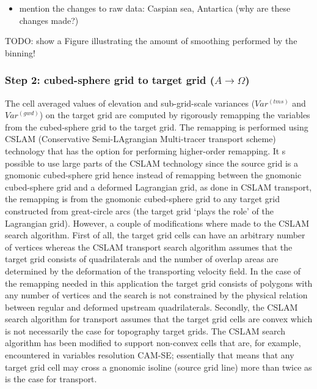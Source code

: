 \documentclass[gmd]{copernicus}
\begin{document}
\begin{itemize}
\item mention the changes to raw data: Caspian sea, Antartica (why are these changes made?)
\end{itemize}

%
%
TODO: show a Figure illustrating the amount of smoothing performed by the binning!
%
\subsubsection{Step 2: cubed-sphere grid to target grid ($A\rightarrow \Omega$)}
The cell averaged values of elevation and sub-grid-scale variances ($Var^{(tms)}$ and $Var^{(gwd)}$) on the target grid are computed by rigorously remapping the variables from the cubed-sphere grid to the target grid.  The remapping is performed using CSLAM (Conservative Semi-LAgrangian Multi-tracer transport scheme) technology \citep{LNU2010JCP} that has the option for performing higher-order remapping. It s possible to use large parts of the CSLAM technology since the source grid is a gnomonic cubed-sphere grid hence instead of remapping between the gnomonic cubed-sphere grid and a deformed Lagrangian grid, as done in CSLAM transport, the remapping is from the gnomonic cubed-sphere grid to any target grid constructed from great-circle arcs (the target grid `plays the role' of the Lagrangian grid). However, a couple of modifications where made to the CSLAM search algorithm. First of all, the target grid cells can have an arbitrary number of vertices whereas the CSLAM transport search algorithm assumes that the target grid consists of quadrilaterals and the number of overlap areas are determined by the deformation of the transporting velocity field. In the case of the remapping needed in this application the target grid consists of polygons with any number of vertices and the search is not constrained by the physical relation between regular and deformed upstream quadrilaterals. Secondly, the CSLAM search algorithm for transport assumes that the target grid cells are convex which is not necessarily the case for topography target grids. The CSLAM search algorithm has been modified to support non-convex cells that are, for example, encountered in variables resolution CAM-SE; essentially that means that any target grid cell may cross a gnonomic isoline (source grid line) more than twice as is the case for transport.
\end{document}
